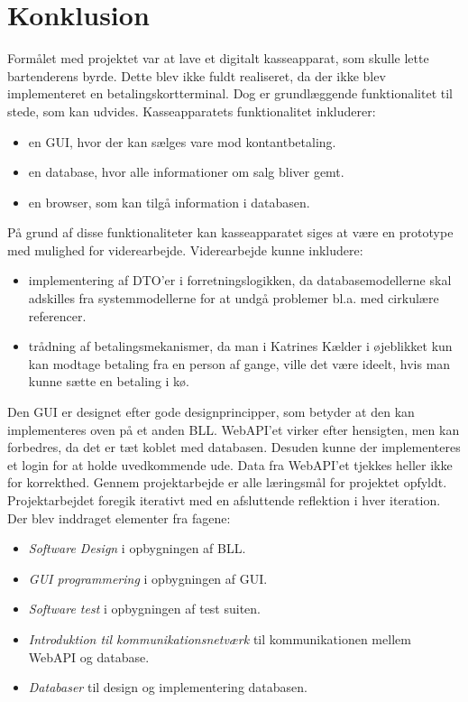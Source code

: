 \chapter{Konklusion}
Formålet med projektet var at lave et digitalt kasseapparat, som skulle lette bartenderens byrde. Dette blev ikke fuldt realiseret, da der ikke blev implementeret en betalingskortterminal. Dog er grundlæggende funktionalitet til stede, som kan udvides. Kasseapparatets funktionalitet inkluderer:
\begin{itemize}
	\item en \gls{GUI}, hvor der kan sælges vare mod kontantbetaling.
	\item en database, hvor alle informationer om salg bliver gemt.
	\item en browser, som kan tilgå information i databasen.
\end{itemize}
På grund af disse funktionaliteter kan kasseapparatet siges at være en prototype med mulighed for viderearbejde. Viderearbejde kunne inkludere:
\begin{itemize}
	\item implementering af \gls{DTO}'er i forretningslogikken, da databasemodellerne skal adskilles fra systemmodellerne for at undgå problemer bl.a. med cirkulære referencer.
	\item trådning af betalingsmekanismer, da man i Katrines Kælder i øjeblikket kun kan modtage betaling fra en person af gange, ville det være ideelt, hvis man kunne sætte en betaling i kø.
\end{itemize}
Den \gls{GUI} er designet efter gode designprincipper, som betyder at den kan implementeres oven på et anden \gls{BLL}.
\newline\newline
\gls{WebAPI}'et virker efter hensigten, men kan forbedres, da det er tæt koblet med databasen. Desuden kunne der implementeres et login for at holde uvedkommende ude. Data fra \gls{WebAPI}'et tjekkes heller ikke for korrekthed.
\newline\newline
Gennem projektarbejde er alle læringsmål for projektet opfyldt. Projektarbejdet foregik iterativt med en afsluttende reflektion i hver iteration. Der blev inddraget elementer fra fagene:
\begin{itemize}
	\item \textit{Software Design} i opbygningen af \gls{BLL}. 
	\item \textit{GUI programmering} i opbygningen af \gls{GUI}.
	\item \textit{Software test} i opbygningen af test suiten.
	\item \textit{Introduktion til kommunikationsnetværk} til kommunikationen mellem \gls{WebAPI} og database. 
	\item \textit{Databaser} til design og implementering databasen.
 \end{itemize}
